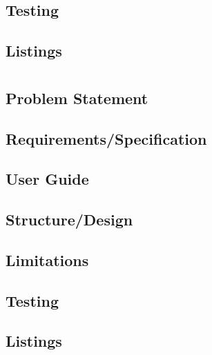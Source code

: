 \documentclass{report}
\begin{document}
\section{Testing}
\section{Listings}
\chapter{}
\section{Problem Statement}
\section{Requirements/Specification}
\section{User Guide}
\section{Structure/Design}
\section{Limitations}
\section{Testing}
\section{Listings}
\end{document}
